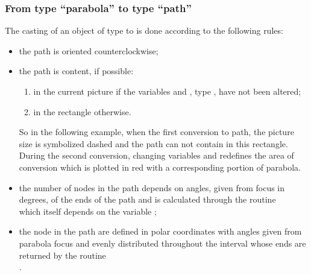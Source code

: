 \documentclass[pdftex]{article}
\begin{document}
\subsubsection{From type ``parabola'' to type ``path''}
The casting of an object  of type  to 
is done according to the following rules:
\begin{itemize}
\item the path is oriented counterclockwise;
\item the path is content, if possible:
  \begin{enumerate}
  \item in the current picture if the variables 
    and , type ,  have not been altered;
  \item in the rectangle  otherwise.
  \end{enumerate}
  So in the following example, when the first conversion to path,
  the picture size is symbolized dashed and the path can not contain in
  this rectangle. During the second conversion, changing
  variables  and  redefines the area of
  conversion which is plotted in red with a corresponding portion of
  parabola.
\item the number of nodes in the path depends on angles, given from
  focus in degrees, of the ends of the path and is calculated through the routine\hfill\\
  \linebreak
  which itself depends on the variable ;
\item the node in the path are defined in polar coordinates with
  angles given from parabola focus and evenly distributed throughout
  the interval whose ends are returned by the routine\hfill\\
  .
\end{itemize}
\end{document}
